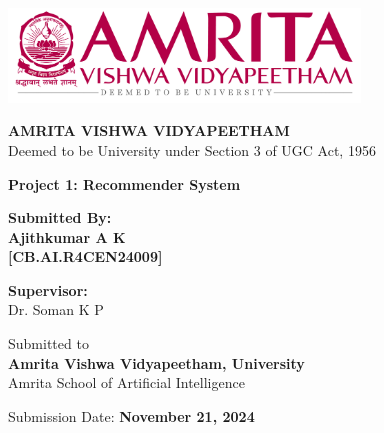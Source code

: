 \documentclass[11pt, a4paper]{report}
\begin{document}
\begin{titlepage}
    \centering
    \includegraphics[width=0.7\textwidth]{amrita_logo.png} %
    \vspace{0.5cm}
    
    {\Large \textbf{AMRITA VISHWA VIDYAPEETHAM}}\\
    \vspace{0.2cm}
    {\large Deemed to be University under Section 3 of UGC Act, 1956}
    \vspace{1.5cm}
    
    {\Huge \textbf{Project 1: Recommender System }}\\
    \vspace{2cm}
    
    {\large \textbf{Submitted By:}}\\
    \vspace{0.5cm}
    {\Large \textbf{Ajithkumar A K}}\\
    \textbf{[CB.AI.R4CEN24009]}\\
    \vspace{2cm}
    
    {\large \textbf{Supervisor:}}\\
    \vspace{0.5cm}
    {\Large Dr. Soman K P}\\
    \vspace{2cm}
    
    {\large Submitted to}\\
    {\large \textbf{Amrita Vishwa Vidyapeetham, University}}\\
    {\large Amrita School of Artificial Intelligence}\\
    \vspace{2cm}
    
    {\large Submission Date: \textbf{November 21, 2024}}
\end{titlepage}
\end{document}
